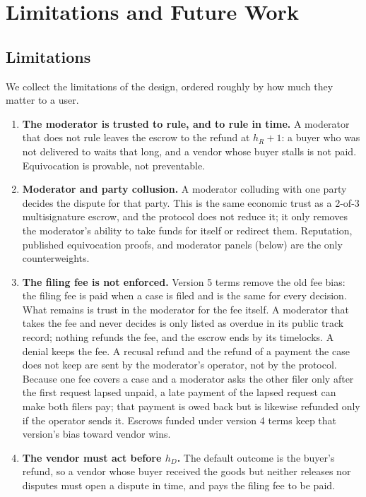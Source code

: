 \section{Limitations and Future Work}
\label{sec:limitations}

\subsection{Limitations}

We collect the limitations of the design, ordered roughly by how much they matter to a user.

\begin{enumerate}
  \item \textbf{The moderator is trusted to rule, and to rule in time.} A moderator that does not rule leaves the escrow to the refund at $h_R+1$: a buyer who was not delivered to waits that long, and a vendor whose buyer stalls is not paid. Equivocation is provable, not preventable.
  \item \textbf{Moderator and party collusion.} A moderator colluding with one party decides the dispute for that party. This is the same economic trust as a 2-of-3 multisignature escrow, and the protocol does not reduce it; it only removes the moderator's ability to take funds for itself or redirect them. Reputation, published equivocation proofs, and moderator panels (below) are the only counterweights.
  \item \textbf{The filing fee is not enforced.} Version 5 terms remove the old fee bias: the filing fee is paid when a case is filed and is the same for every decision. What remains is trust in the moderator for the fee itself. A moderator that takes the fee and never decides is only listed as overdue in its public track record; nothing refunds the fee, and the escrow ends by its timelocks. A denial keeps the fee. A recusal refund and the refund of a payment the case does not keep are sent by the moderator's operator, not by the protocol. Because one fee covers a case and a moderator asks the other filer only after the first request lapsed unpaid, a late payment of the lapsed request can make both filers pay; that payment is owed back but is likewise refunded only if the operator sends it. Escrows funded under version 4 terms keep that version's bias toward vendor wins.
  \item \textbf{The vendor must act before $h_D$.} The default outcome is the buyer's refund, so a vendor whose buyer received the goods but neither releases nor disputes must open a dispute in time, and pays the filing fee to be paid.

\end{enumerate}
